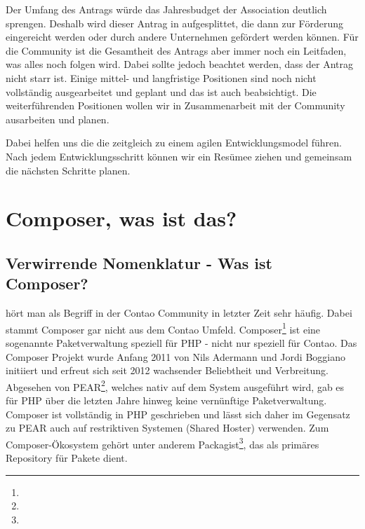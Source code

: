 \documentclass[
paper=a4,
draft=false,%
fontsize=10pt%
]{scrartcl}
\begin{document}
Der Umfang des Antrags würde das Jahresbudget der Association deutlich sprengen. Deshalb wird dieser Antrag in  aufgesplittet, die dann zur Förderung eingereicht werden oder durch andere Unternehmen gefördert werden können.
Für die Community ist die Gesamtheit des Antrags aber immer noch ein Leitfaden, was alles noch folgen wird.
Dabei sollte jedoch beachtet werden, dass der Antrag nicht starr ist. Einige mittel- und langfristige Positionen sind noch nicht vollständig ausgearbeitet und geplant und das ist auch beabsichtigt. Die weiterführenden Positionen wollen wir in Zusammenarbeit mit der Community ausarbeiten und planen.

Dabei helfen uns die  die zeitgleich zu einem agilen Entwicklungsmodel führen. Nach jedem Entwicklungsschritt können wir ein Resümee ziehen und gemeinsam die nächsten Schritte planen.

\newpage

%
%

\section{Composer, was ist das?}
\label{sec:why-composer}

\subsection{Verwirrende Nomenklatur - Was ist Composer?}

 hört man als Begriff in der Contao Community in letzter Zeit sehr häufig. Dabei stammt Composer gar nicht aus dem Contao Umfeld. Composer\footnote{} ist eine sogenannte Paketverwaltung speziell für PHP - nicht nur speziell für Contao. Das Composer Projekt wurde Anfang 2011 von Nils Adermann und Jordi Boggiano initiiert und erfreut sich seit 2012 wachsender Beliebtheit und Verbreitung. Abgesehen von PEAR\footnote{}, welches nativ auf dem System ausgeführt wird, gab es für PHP über die letzten Jahre hinweg keine vernünftige Paketverwaltung. Composer ist vollständig in PHP geschrieben und lässt sich daher im Gegensatz zu PEAR auch auf restriktiven Systemen (Shared Hoster) verwenden. Zum Composer-Ökosystem gehört unter anderem Packagist\footnote{}, das als primäres Repository für Pakete dient.
\end{document}
